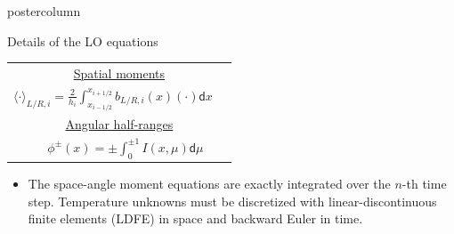\documentclass[xcolor=dvipsnames]{beamer}
\renewcommand{\d}{\mathsf{d}}
\newcommand{\mom}[1]{\langle #1 \rangle}
\newcommand{\il}{{i-1/2}}
\newcommand{\ir}{{i+1/2}}
\newcommand{\colb}[1]{{\color{blue} #1}}
\begin{document}
\begin{frame}
\begin{columns}
\begin{column}{.49\textwidth}
\begin{beamercolorbox}[center,wd=\textwidth]{postercolumn}
\begin{minipage}[T]{0.95\textwidth}
{\begin{block}{Details of the LO equations}
\begin{minipage}{0.45\textwidth}
        \centering
    \end{minipage}
    \begin{minipage}{0.45\textwidth}
    \begin{center}
        {\small
    \begin{tabular}{c}
        \underline{Spatial moments} \\[1em]
        $ {\displaystyle \mom{\cdot}_{L/R,i} = \frac{2}{h_i} \int_{x_\il}^{x_\ir}
        b_{L/R,i}(x)(\cdot) \d x \quad }$ \vspace{0.4in} \\[1em]  \underline{Angular half-ranges}
        \\[1em] ${ \quad \displaystyle \phi^\pm(x) =
            \pm\int_0^{\pm 1} I(x,\mu) \d \mu}$ \vspace{0.3in}
\end{tabular}}
    \end{center}
\end{minipage}
    \begin{itemize} 
        \item The space-angle moment equations are exactly integrated over the $n$-th time
            step.  Temperature unknowns must be discretized with linear-discontinuous
            finite elements (LDFE) in space and backward
            Euler in time.
        \setlength\itemsep{0.5em}

\end{itemize}
\end{block}}
\end{minipage}
\end{beamercolorbox}
\end{column}
\end{columns}
\end{frame}
\end{document}

